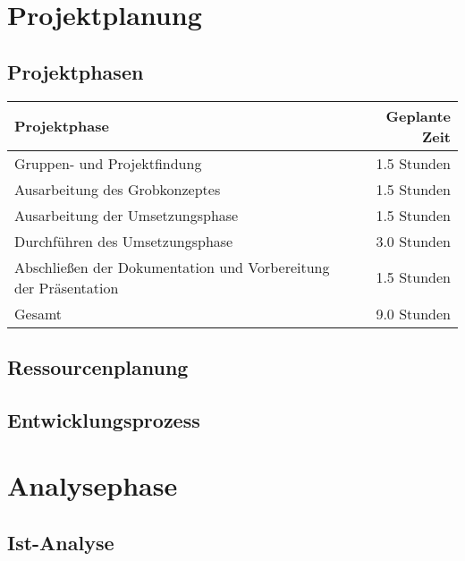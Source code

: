 \documentclass[12pt]{article} %
\begin{document}
	\section{Projektplanung}
	\label{sec:projektplanung}
	\projektplanungText
	
	\subsection{Projektphasen}
	\label{subsec:projektphasen}
	\projektphasenText
	\neuerAbsatz
	\begin{center}
		\begin{tabular}[h]{|l|r|}
		\hline
		Projektphase & Geplante Zeit \\
		\hline
		Gruppen- und Projektfindung & 1.5 Stunden \\
		\hline
		Ausarbeitung des Grobkonzeptes & 1.5 Stunden \\
		\hline
		Ausarbeitung der Umsetzungsphase & 1.5 Stunden \\
		\hline
		Durchführen des Umsetzungsphase & 3.0 Stunden \\
		\hline
		Abschließen der Dokumentation und Vorbereitung der Präsentation & 1.5 Stunden \\
		\hline
		Gesamt & 9.0 Stunden \\
		\hline
		\end{tabular}
	\end{center}
	\label{tab:tabelle1}
	
	\subsection{Ressourcenplanung}
	\label{subsec:ressourcenplanung}
	\ressourcenplanungText
	
	\subsection{Entwicklungsprozess}
	\label{subsec:entwicklungsprozess}
	\entwicklungsprozessText
	
	\section{Analysephase}
	\label{sec:analysephase}
	\analysephaseText
	
	\subsection{Ist-Analyse}
	\label{subsec:istanalyse}
	\istanalyseText
	
\end{document}
